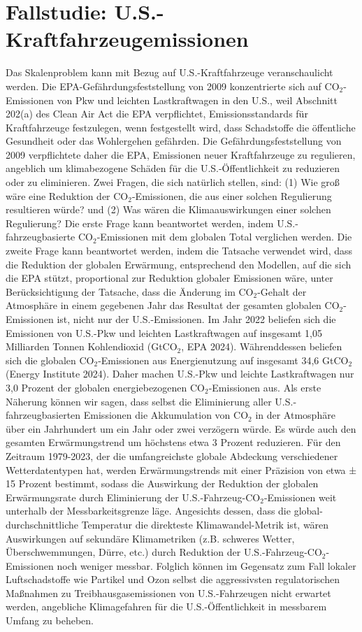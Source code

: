 \documentclass[12pt,paper=a4,DIV=12,parskip=never,chapterprefix=false,headings=standardclasses]{scrreprt}
\begin{document}
\section{Fallstudie: U.S.-Kraftfahrzeugemissionen}
Das Skalenproblem kann mit Bezug auf U.S.-Kraftfahrzeuge veranschaulicht werden. Die EPA-Gefährdungsfeststellung von 2009 konzentrierte sich auf CO$_2$-Emissionen von Pkw und leichten Lastkraftwagen in den U.S., weil Abschnitt 202(a) des Clean Air Act die EPA verpflichtet, Emissionsstandards für Kraftfahrzeuge festzulegen, wenn festgestellt wird, dass Schadstoffe die öffentliche Gesundheit oder das Wohlergehen gefährden. Die Gefährdungsfeststellung von 2009 verpflichtete daher die EPA, Emissionen neuer Kraftfahrzeuge zu regulieren, angeblich um klimabezogene Schäden für die U.S.-Öffentlichkeit zu reduzieren oder zu eliminieren.
Zwei Fragen, die sich natürlich stellen, sind: (1) Wie groß wäre eine Reduktion der CO$_2$-Emissionen, die aus einer solchen Regulierung resultieren würde? und (2) Was wären die Klimaauswirkungen einer solchen Regulierung?
Die erste Frage kann beantwortet werden, indem U.S.-fahrzeugbasierte CO$_2$-Emissionen mit dem globalen Total verglichen werden. Die zweite Frage kann beantwortet werden, indem die Tatsache verwendet wird, dass die Reduktion der globalen Erwärmung, entsprechend den Modellen, auf die sich die EPA stützt, proportional zur Reduktion globaler Emissionen wäre, unter Berücksichtigung der Tatsache, dass die Änderung im CO$_2$-Gehalt der Atmosphäre in einem gegebenen Jahr das Resultat der gesamten globalen CO$_2$-Emissionen ist, nicht nur der U.S.-Emissionen.
Im Jahr 2022 beliefen sich die Emissionen von U.S.-Pkw und leichten Lastkraftwagen auf insgesamt 1,05 Milliarden Tonnen Kohlendioxid (GtCO$_2$, EPA 2024). Währenddessen beliefen sich die globalen CO$_2$-Emissionen aus Energienutzung auf insgesamt 34,6 GtCO$_2$ (Energy Institute 2024). Daher machen U.S.-Pkw und leichte Lastkraftwagen nur 3,0 Prozent der globalen energiebezogenen CO$_2$-Emissionen aus. Als erste Näherung können wir sagen, dass selbst die Eliminierung aller U.S.-fahrzeugbasierten Emissionen die Akkumulation von CO$_2$ in der Atmosphäre über ein Jahrhundert um ein Jahr oder zwei verzögern würde.
Es würde auch den gesamten Erwärmungstrend um höchstens etwa 3 Prozent reduzieren. Für den Zeitraum 1979-2023, der die umfangreichste globale Abdeckung verschiedener Wetterdatentypen hat, werden Erwärmungstrends mit einer Präzision von etwa ± 15 Prozent bestimmt, sodass die Auswirkung der Reduktion der globalen Erwärmungsrate durch Eliminierung der U.S.-Fahrzeug-CO$_2$-Emissionen weit unterhalb der Messbarkeitsgrenze läge. Angesichts dessen, dass die global-durch\-schnittliche Temperatur die direkteste Klimawandel-Metrik ist, wären Auswirkungen auf sekundäre Klimametriken (z.B. schweres Wetter, Überschwemmungen, Dürre, etc.) durch Reduktion der U.S.-Fahrzeug-CO$_2$-Emissionen noch weniger messbar.
Folglich können im Gegensatz zum Fall lokaler Luftschadstoffe wie Partikel und Ozon selbst die aggressivsten regulatorischen Maßnahmen zu Treibhausgasemissionen von U.S.-Fahrzeugen nicht erwartet werden, angebliche Klimagefahren für die U.S.-Öffentlichkeit in messbarem Umfang zu beheben.
\end{document}
